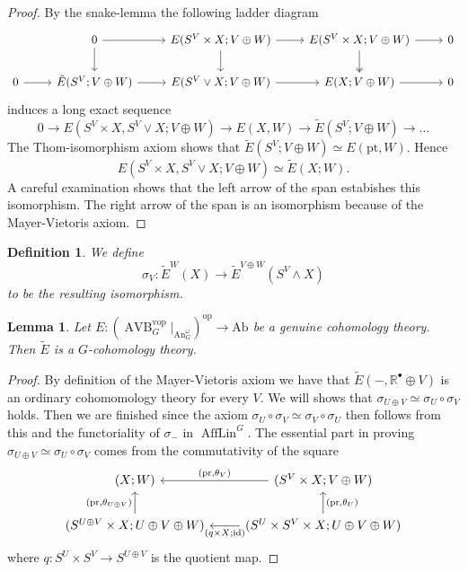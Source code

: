 \documentclass{article}
\newcommand{\R}{\mathbb{R}} %
\newcommand{\Ab}{\mathrm{Ab}}
\newcommand{\pt}{\mathrm{pt}}
\newcommand{\op}{\mathrm{op}}
\newcommand{\vop}{\mathrm{vop}}
\newcommand{\pr}{\mathrm{pr}}
\newcommand{\id}{\mathrm{id}}
\DeclareMathOperator{\AVB}{AVB}
\DeclareMathOperator{\An}{An}
\DeclareMathOperator{\AffLin}{AffLin}
\newtheorem{lemma}{Lemma}
\newtheorem{definition}{Definition}
\begin{document}
\begin{proof}
By the snake-lemma the following ladder diagram 
    \[\begin{tikzcd}
        & 0 & {E(S^V\times X;V\oplus W)} & {E(S^V\times X;V\oplus W)} & 0 \\
        0 & {\tilde E(S^V;V\oplus W)} & {E(S^V\vee X;V\oplus W)} & {E(X;V\oplus W)} & 0
        \arrow[from=2-2, to=2-3]
        \arrow[from=2-3, to=2-4]
        \arrow[from=2-4, to=2-5]
        \arrow[from=2-1, to=2-2]
        \arrow[from=1-3, to=2-3]
        \arrow[from=1-2, to=1-3]
        \arrow[from=1-2, to=2-2]
        \arrow[from=1-3, to=1-4]
        \arrow[from=1-4, to=1-5]
        \arrow[two heads, from=1-4, to=2-4]
    \end{tikzcd}\]
induces a long exact sequence
\[
0 \to E(S^V \times X, S^V \vee X; V \oplus W) \to E(X, W) \to \tilde E(S^V; V \oplus W) \to \dots 
\]
The Thom-isomorphism axiom shows that $\tilde E(S^V; V\oplus W) \simeq E(\pt, W)$. 
Hence \[E(S^V \times X, S^V \vee X; V \oplus W) \simeq \tilde E(X;W).\]
A careful examination shows that the left arrow of the span estabishes this isomorphism. The right arrow of the span 
is an isomorphism because of the Mayer-Vietoris axiom.
\end{proof}
\begin{definition}
    We define 
    \[
    \sigma_V \colon \tilde  E^W(X) \to \tilde E^{V\oplus W}(S^V \wedge X)    
    \]
    to be the resulting isomorphism.
\end{definition}

\begin{lemma}
    Let $E \colon (\AVB^\vop_G|_{\An_G^\omega})^\op \to \Ab$ be a genuine cohomology theory.
    Then $\tilde E$ is a $G$-cohomology theory.
\end{lemma}
\begin{proof}
    By definition of the Mayer-Vietoris axiom we have that $\tilde E(-, \R^\bullet \oplus V)$ is an ordinary cohomomology theory 
    for every $V$.
    We will shows that $\sigma_{U\oplus V} \simeq \sigma_U \circ \sigma_V$ holds. Then we are finished since the axiom 
    $\sigma_U \circ \sigma_V \simeq \sigma_V \circ \sigma_U$ then follows from this and the functoriality of 
    $\sigma_{-}$ in $\AffLin^G$.
    The essential part in proving $\sigma_{U\oplus V} \simeq \sigma_U \circ \sigma_V$  comes from the commutativity of the square 
    \[\begin{tikzcd}
        {(X;W)} & {(S^V\times X;V \oplus W)} \\
        {(S^{U\oplus V}\times X;U\oplus V\oplus W)} & {(S^U\times S^V \times X;U\oplus V\oplus W)}
        \arrow["{(\pr,\theta_V)}"', from=1-2, to=1-1]
        \arrow["{(\pr,\theta_{U\oplus V})}", from=2-1, to=1-1]
        \arrow["{(q\times X;\id)}", from=2-2, to=2-1]
        \arrow["{(\pr,\theta_U)}"', from=2-2, to=1-2]
    \end{tikzcd}\]
    where $q\colon S^U \times S^V \to S^{U\oplus V}$ is the quotient map.
\end{proof}
\end{document}
